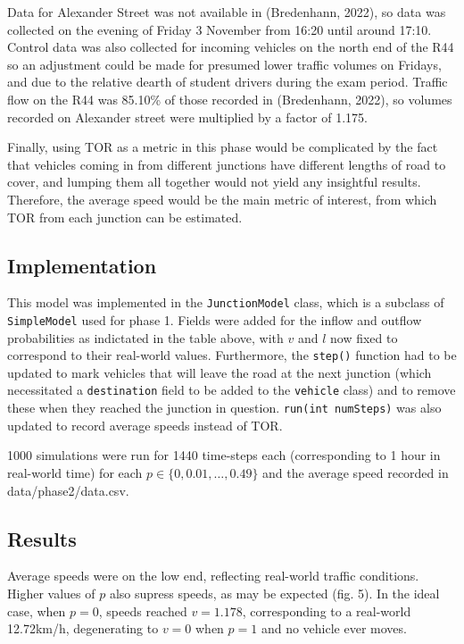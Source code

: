 \documentclass{article}
\begin{document}
Data for Alexander Street was not available in (Bredenhann, 2022), so data was collected on the evening of Friday 3 November from 16:20 until around 17:10. Control data was also collected for incoming vehicles on the north end of the R44 so an adjustment could be made for presumed lower traffic volumes on Fridays, and due to the relative dearth of student drivers during the exam period. Traffic flow on the R44 was 85.10\% of those recorded in (Bredenhann, 2022), so volumes recorded on Alexander street were multiplied by a factor of 1.175.

Finally, using TOR as a metric in this phase would be complicated by the fact that vehicles coming in from different junctions have different lengths of road to cover, and lumping them all together would not yield any insightful results. Therefore, the average speed would be the main metric of interest, from which TOR from each junction can be estimated.

\subsection*{Implementation}

This model was implemented in the \texttt{JunctionModel} class, which is a subclass of \texttt{SimpleModel} used for phase 1. Fields were added for the inflow and outflow probabilities as indictated in the table above, with $v$ and $l$ now fixed to correspond to their real-world values. Furthermore, the \texttt{step()} function had to be updated to mark vehicles that will leave the road at the next junction (which necessitated a \texttt{destination} field to be added to the \texttt{vehicle} class) and to remove these when they reached the junction in question. \texttt{run(int numSteps)} was also updated to record average speeds instead of TOR.

1000 simulations were run for 1440 time-steps each (corresponding to 1 hour in real-world time) for each $p \in \{0, 0.01, \dots , 0.49\}$ and the average speed recorded in data/phase2/data.csv.

\subsection*{Results}

Average speeds were on the low end, reflecting real-world traffic conditions. Higher values of $p$ also supress speeds, as may be expected (fig. 5). In the ideal case, when $p=0$, speeds reached $v=1.178$, corresponding to a real-world 12.72km/h, degenerating to $v=0$ when $p=1$ and no vehicle ever moves.
\end{document}

